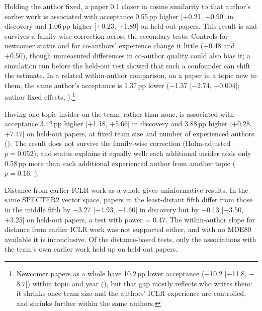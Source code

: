 Holding the author fixed, a paper 0.1 closer in cosine similarity to that author's earlier work is associated with
acceptance 0.55\,pp higher [+0.21, +0.90] in discovery and 1.06\,pp higher [+0.23, +1.89] on held-out papers. This
result is  and survives a family-wise correction across the secondary tests. Controls for
newcomer status and for co-authors' experience change it little (+0.48 and +0.50), though unmeasured differences in
co-author quality could also bias it; a simulation run before the held-out test showed that such a confounder can
shift the estimate. In a related within-author comparison, on a paper in a topic new to them, the same author's
acceptance is 1.37\,pp lower ($-$1.37 [$-$2.74, $-$0.004]; author fixed effects, ).\footnote{Newcomer
papers as a whole have 10.2\,pp lower acceptance ($-$10.2 [$-$11.8, $-$8.7]) within topic and year
(), but that gap mostly reflects who writes them: it shrinks once team size and the authors' ICLR
experience are controlled, and shrinks further within the same authors.}

Having one topic insider on the team, rather than none, is associated with acceptance 3.42\,pp higher [+1.18, +5.66] in
discovery and 3.88\,pp higher [+0.28, +7.47] on held-out papers, at fixed team size and number of experienced authors
(). The result does not survive the family-wise correction (Holm-adjusted $p = 0.052$), and
status explains it equally well: each additional insider adds only 0.58\,pp more than each additional experienced
author from another topic ($p = 0.16$; ).

Distance from earlier ICLR work as a whole gives uninformative results. In the same SPECTER2 vector space, papers in
the least-distant fifth differ from those in the middle fifth by $-$3.27 [$-$4.93, $-$1.60] in discovery but by $-$0.13
[$-$3.50, +3.25] on held-out papers, a test with power = 0.47. The within-author slope for distance from earlier ICLR
work was not supported either, and with no MDE80 available it is inconclusive. Of the distance-based tests, only the
associations with the team's own earlier work held up on held-out papers.
